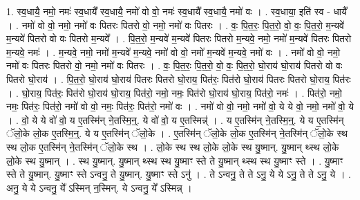 \documentclass[17pt]{extarticle}
\begin{document}
1. स्व॒धायै॒ नमो॒ नमः॑ स्व॒धायै᳚ स्व॒धायै॒ नमो॑ वो वो॒ नमः॑ स्व॒धायै᳚ स्व॒धायै॒ नमो॑ वः । . स्व॒धाया॒ इति॑ स्व - धायै᳚ । . नमो॑ वो वो॒ नमो॒ नमो॑ वः पितरः पितरो वो॒ नमो॒ नमो॑ वः पितरः । . वः॒ पि॒त॒रः॒ पि॒त॒रो॒ वो॒ वः॒ पि॒त॒रो॒ म॒न्यवे॑ म॒न्यवे॑ पितरो वो वः पितरो म॒न्यवे᳚ । . पि॒त॒रो॒ म॒न्यवे॑ म॒न्यवे॑ पितरः पितरो म॒न्यवे॒ नमो॒ नमो॑ म॒न्यवे॑ पितरः पितरो म॒न्यवे॒ नमः॑ । . म॒न्यवे॒ नमो॒ नमो॑ म॒न्यवे॑ म॒न्यवे॒ नमो॑ वो वो॒ नमो॑ म॒न्यवे॑ म॒न्यवे॒ नमो॑ वः । . नमो॑ वो वो॒ नमो॒ नमो॑ वः पितरः पितरो वो॒ नमो॒ नमो॑ वः पितरः । . वः॒ पि॒त॒रः॒ पि॒त॒रो॒ वो॒ वः॒ पि॒त॒रो॒ घो॒राय॑ घो॒राय॑ पितरो वो वः पितरो घो॒राय॑ । . पि॒त॒रो॒ घो॒राय॑ घो॒राय॑ पितरः पितरो घो॒राय॒ पित॑रः॒ पित॑रो घो॒राय॑ पितरः पितरो घो॒राय॒ पित॑रः । . घो॒राय॒ पित॑रः॒ पित॑रो घो॒राय॑ घो॒राय॒ पित॑रो॒ नमो॒ नमः॒ पित॑रो घो॒राय॑ घो॒राय॒ पित॑रो॒ नमः॑ । . पित॑रो॒ नमो॒ नमः॒ पित॑रः॒ पित॑रो॒ नमो॑ वो वो॒ नमः॒ पित॑रः॒ पित॑रो॒ नमो॑ वः । . नमो॑ वो वो॒ नमो॒ नमो॑ वो॒ ये ये वो॒ नमो॒ नमो॑ वो॒ ये । . वो॒ ये ये वो॑ वो॒ य ए॒तस्मि॑न् ने॒तस्मि॒न्॒. ये वो॑ वो॒ य ए॒तस्मिन्न्॑ । . य ए॒तस्मि॑न् ने॒तस्मि॒न्॒. ये य ए॒तस्मि॑न् ॅलो॒के लो॒क ए॒तस्मि॒न्॒. ये य ए॒तस्मि॑न् ॅलो॒के । . ए॒तस्मि॑न् ॅलो॒के लो॒क ए॒तस्मि॑न् ने॒तस्मि॑न् ॅलो॒के स्थ स्थ लो॒क ए॒तस्मि॑न् ने॒तस्मि॑न् ॅलो॒के स्थ । . लो॒के स्थ स्थ लो॒के लो॒के स्थ यु॒ष्मान्. यु॒ष्मान् थ्स्थ लो॒के लो॒के स्थ यु॒ष्मान् । . स्थ यु॒ष्मान्. यु॒ष्मान् थ्स्थ स्थ यु॒ष्माꣳ स्ते ते यु॒ष्मान् थ्स्थ स्थ यु॒ष्माꣳ स्ते । . यु॒ष्माꣳ स्ते ते यु॒ष्मान्. यु॒ष्माꣳ स्ते ऽन्वनु॒ ते यु॒ष्मान्. यु॒ष्माꣳ स्ते ऽनु॑ । . ते ऽन्वनु॒ ते ते ऽनु॒ ये ये ऽनु॒ ते ते ऽनु॒ ये । . अनु॒ ये ये ऽन्वनु॒ ये᳚ ऽस्मिन् न॒स्मिन्. ये ऽन्वनु॒ ये᳚ ऽस्मिन्न् । \newline
\end{document}
